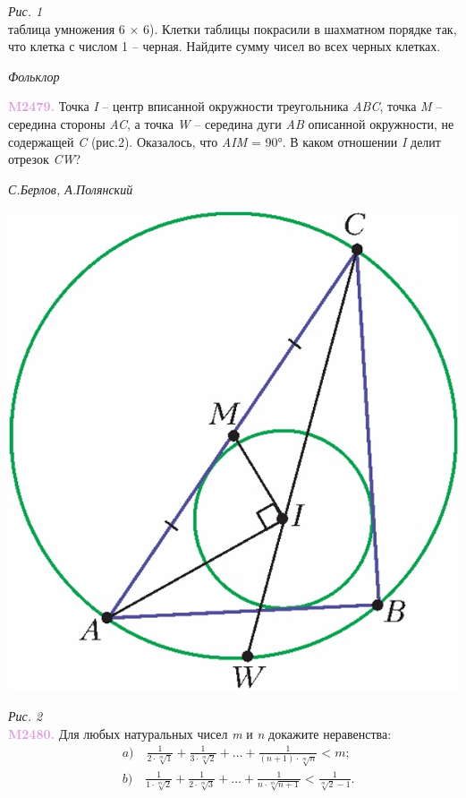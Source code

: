 \documentclass[a4paper,12pt]{article}
\begin{document}
\begin{multicols}{2}
\textit{Рис. 1} \\
таблица умножения 6 × 6). Клетки таблицы 
покрасили в шахматном порядке так,
что клетка с числом 1 – черная. Найдите
сумму чисел во всех черных клетках.
\vspace{-0.8em}
\begin{flushright}
    \textit{Фольклор} \\
\end{flushright}

\noindent
\textcolor{Plum}{\textbf{M2479.}}
Точка \textit{I} – центр вписанной окружности 
треугольника \textit{ABC}, точка \textit{M} – середина 
стороны \textit{AC}, а точка \textit{W} – середина дуги 
\textit{AB} описанной окружности, не содержащей 
\textit{C} (рис.2). Оказалось, что \textit{\angle}\textit{AIM} = 90°. 
В каком отношении \textit{I} делит отрезок \textit{CW}?
\vspace{-0.8em}
\begin{flushright}
    \textit{С.Берлов, А.Полянский} \\
\end{flushright}

\begin{center}
    \includegraphics[width=0.65\linewidth]{pic.jpeg}
\end{center}

\textit{Рис. 2} \\
\noindent
\textcolor{Plum}{\textbf{M2480.}}
Для любых натуральных чисел \textit{m}
и \textit{n} докажите неравенства: \\
\noindent
\vspace{-1.5em}
\begin{align*}
    &a)\quad \frac{1}{2 \cdot \sqrt[m]{1}} + 
    \frac{1}{3 \cdot \sqrt[m]{2}} + 
    \dots +
    \frac{1}{(n + 1) \cdot \sqrt[m]{n}} < m; \\
    &b)\quad \frac{1}{1 \cdot \sqrt[m]{2}} + 
    \frac{1}{2 \cdot \sqrt[m]{3}} + 
    \dots +
    \frac{1}{n \cdot \sqrt[m]{n + 1}} < \frac{1}{\sqrt[m]{2} - 1}.
\end{align*}


\end{multicols}
\end{document}
